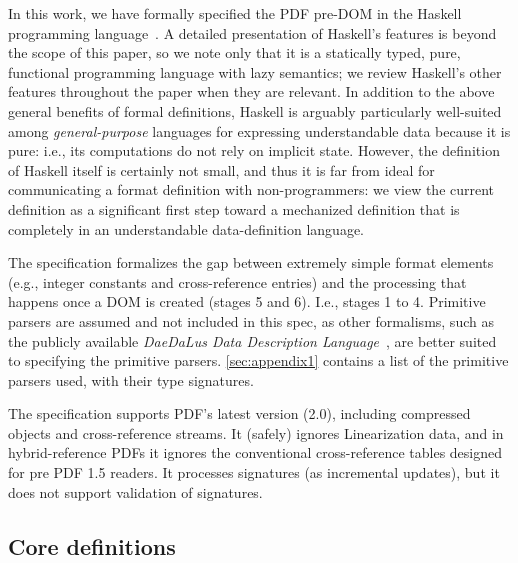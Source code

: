 In this work, we have formally specified the PDF pre-DOM
in the Haskell programming language~\cite{jones2003haskell}.
%
A detailed presentation of Haskell's features is beyond the scope of
this paper, so we note only that it is a statically typed, pure,
functional programming language with lazy semantics;
%
we review Haskell's other features throughout the paper when they are
relevant.
In addition to the above general benefits of formal definitions, Haskell is arguably particularly well-suited among \emph{general-purpose} languages for expressing understandable data because it is pure: i.e., its computations do not rely on implicit state.
However, the definition of Haskell itself is certainly not small, and thus it is far from ideal for communicating a format definition with non-programmers: we view the current definition as a significant first step toward a mechanized definition that is completely in an understandable data-definition language. 

The specification formalizes the gap between extremely simple format elements (e.g., integer constants and cross-reference entries) and the
processing that happens once a DOM is created (stages 5 and 6).
%
I.e., stages 1 to 4.
%
Primitive parsers are assumed and not included in this spec, as other
formalisms, such as the publicly available \emph{DaeDaLus Data Description
  Language}~\cite{daedalusrepo}, are better suited to specifying the
primitive parsers.
%
\cref{sec:appendix1} contains a list of the primitive parsers used,
with their type signatures.

The specification supports PDF's latest version (2.0), including compressed objects and cross-reference streams.
%
It (safely) ignores Linearization data, and in hybrid-reference PDFs
it ignores the conventional cross-reference tables designed for pre PDF 1.5 readers.
It processes signatures (as incremental updates), but it does not support
validation of signatures.

\subsection{Core definitions}
\label{sec:core}
\iffalse
\begin{code}
{-# LANGUAGE EmptyDataDecls, TypeOperators, LambdaCase #-}
module Spec where
import           Control.Monad
import           Data.Char
import           Data.Foldable(foldlM)
import qualified Data.IntSet as IntSet
import           Data.List
import qualified Data.Map as M
import           Data.Map(Map)
import           Types
import           Utils
import           Primitives
import           Streams
\end{code}
\fi

